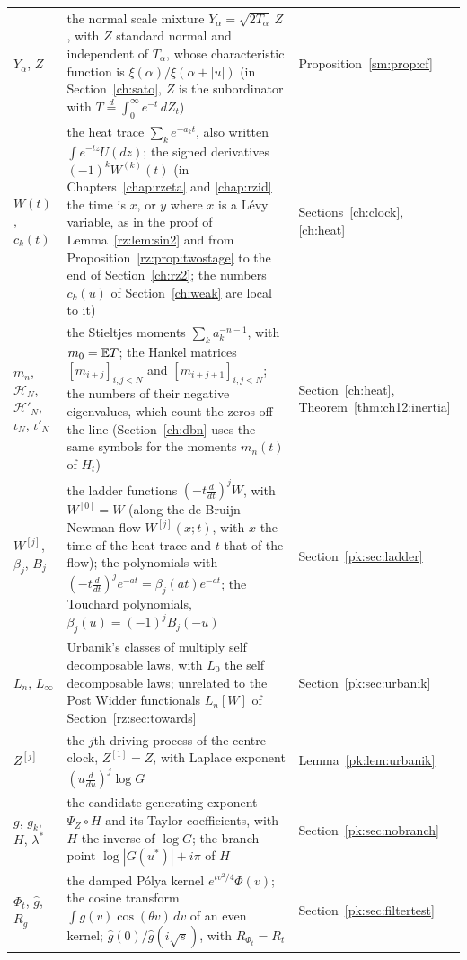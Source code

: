 {\begin{longtable}{@{}p{}p{}p{}@{}}
$Y_\alpha$, $Z$ & \raggedright the normal scale mixture ${Y_\alpha=\sqrt{2T_\alpha}\,Z}$, with $Z$ standard normal and independent of $T_\alpha$, whose characteristic function is ${\xi(\alpha)/\xi(\alpha+|u|)}$ (in Section~\ref{ch:sato}, $Z$ is the subordinator with ${T\stackrel d=\int_0^\infty e^{-t}\,dZ_t}$) & \raggedright Proposition~\ref{sm:prop:cf}\tabularnewline
$W(t)$, $c_k(t)$ & \raggedright the heat trace $\sum_ke^{-a_kt}$, also written $\int e^{-tz}U(dz)$; the signed derivatives $(-1)^kW^{(k)}(t)$ (in Chapters~\ref{chap:rzeta} and \ref{chap:rzid} the time is $x$, or $y$ where $x$ is a L\'evy variable, as in the proof of Lemma~\ref{rz:lem:sin2} and from Proposition~\ref{rz:prop:twostage} to the end of Section~\ref{ch:rz2}; the numbers $c_k(u)$ of Section~\ref{ch:weak} are local to it) & \raggedright Sections~\ref{ch:clock}, \ref{ch:heat}\tabularnewline
$m_n$, $\mathcal H_N$, $\mathcal H'_N$, $\iota_N$, $\iota'_N$ & \raggedright the Stieltjes moments ${\sum_ka_k^{-n-1}}$, with ${m_0=\mathbb{E} T}$; the Hankel matrices ${[m_{i+j}]_{i,j<N}}$ and ${[m_{i+j+1}]_{i,j<N}}$; the numbers of their negative eigenvalues, which count the zeros off the line (Section~\ref{ch:dbn} uses the same symbols for the moments $m_n(t)$ of $H_t$) & \raggedright Section~\ref{ch:heat}, Theorem~\ref{thm:ch12:inertia}\tabularnewline
$W^{[j]}$, $\beta_j$, $B_j$ & \raggedright the ladder functions ${(-t\frac d{dt})^jW}$, with ${W^{[0]}=W}$ (along the de Bruijn Newman flow $W^{[j]}(x;t)$, with $x$ the time of the heat trace and $t$ that of the flow); the polynomials with ${(-t\frac d{dt})^je^{-at}=\beta_j(at)e^{-at}}$; the Touchard polynomials, ${\beta_j(u)=(-1)^jB_j(-u)}$ & \raggedright Section~\ref{pk:sec:ladder}\tabularnewline
$L_n$, $L_\infty$ & \raggedright Urbanik's classes of multiply self decomposable laws, with $L_0$ the self decomposable laws; unrelated to the Post Widder functionals $L_n[W]$ of Section~\ref{rz:sec:towards} & \raggedright Section~\ref{pk:sec:urbanik}\tabularnewline
$Z^{[j]}$ & \raggedright the $j$th driving process of the centre clock, ${Z^{[1]}=Z}$, with Laplace exponent ${(u\frac d{du})^j\log G}$ & \raggedright Lemma~\ref{pk:lem:urbanik}\tabularnewline
$g$, $g_k$, $H$, $\lambda^*$ & \raggedright the candidate generating exponent ${\Psi_Z\circ H}$ and its Taylor coefficients, with $H$ the inverse of $\log G$; the branch point ${\log|G(u^*)|+i\pi}$ of $H$ & \raggedright Section~\ref{pk:sec:nobranch}\tabularnewline
$\Phi_t$, $\widehat g$, $R_g$ & \raggedright the damped P\'olya kernel ${e^{tv^2/4}\Phi(v)}$; the cosine transform ${\int g(v)\cos(\theta v)\,dv}$ of an even kernel; ${\widehat g(0)/\widehat g(i\sqrt s)}$, with ${R_{\Phi_t}=R_t}$ & \raggedright Section~\ref{pk:sec:filtertest}\tabularnewline

\end{longtable}}
